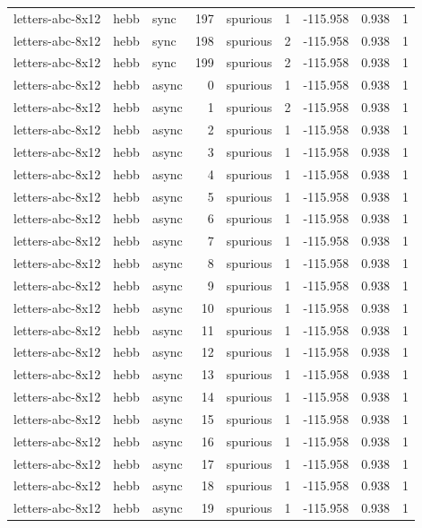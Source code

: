 \begin{tabular}{lllrlrrrr}
letters-abc-8x12 & hebb & sync & 197 & spurious & 1 & -115.958 & 0.938 & 1 \\
letters-abc-8x12 & hebb & sync & 198 & spurious & 2 & -115.958 & 0.938 & 1 \\
letters-abc-8x12 & hebb & sync & 199 & spurious & 2 & -115.958 & 0.938 & 1 \\
letters-abc-8x12 & hebb & async & 0 & spurious & 1 & -115.958 & 0.938 & 1 \\
letters-abc-8x12 & hebb & async & 1 & spurious & 2 & -115.958 & 0.938 & 1 \\
letters-abc-8x12 & hebb & async & 2 & spurious & 1 & -115.958 & 0.938 & 1 \\
letters-abc-8x12 & hebb & async & 3 & spurious & 1 & -115.958 & 0.938 & 1 \\
letters-abc-8x12 & hebb & async & 4 & spurious & 1 & -115.958 & 0.938 & 1 \\
letters-abc-8x12 & hebb & async & 5 & spurious & 1 & -115.958 & 0.938 & 1 \\
letters-abc-8x12 & hebb & async & 6 & spurious & 1 & -115.958 & 0.938 & 1 \\
letters-abc-8x12 & hebb & async & 7 & spurious & 1 & -115.958 & 0.938 & 1 \\
letters-abc-8x12 & hebb & async & 8 & spurious & 1 & -115.958 & 0.938 & 1 \\
letters-abc-8x12 & hebb & async & 9 & spurious & 1 & -115.958 & 0.938 & 1 \\
letters-abc-8x12 & hebb & async & 10 & spurious & 1 & -115.958 & 0.938 & 1 \\
letters-abc-8x12 & hebb & async & 11 & spurious & 1 & -115.958 & 0.938 & 1 \\
letters-abc-8x12 & hebb & async & 12 & spurious & 1 & -115.958 & 0.938 & 1 \\
letters-abc-8x12 & hebb & async & 13 & spurious & 1 & -115.958 & 0.938 & 1 \\
letters-abc-8x12 & hebb & async & 14 & spurious & 1 & -115.958 & 0.938 & 1 \\
letters-abc-8x12 & hebb & async & 15 & spurious & 1 & -115.958 & 0.938 & 1 \\
letters-abc-8x12 & hebb & async & 16 & spurious & 1 & -115.958 & 0.938 & 1 \\
letters-abc-8x12 & hebb & async & 17 & spurious & 1 & -115.958 & 0.938 & 1 \\
letters-abc-8x12 & hebb & async & 18 & spurious & 1 & -115.958 & 0.938 & 1 \\
letters-abc-8x12 & hebb & async & 19 & spurious & 1 & -115.958 & 0.938 & 1 \\

\end{tabular}
